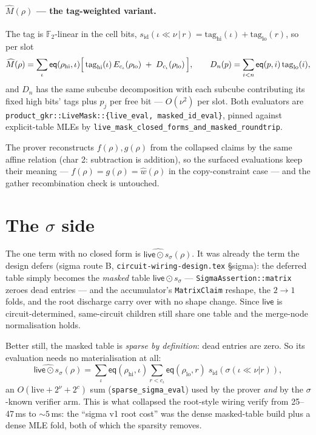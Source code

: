 \documentclass[11pt]{article}
\newcommand{\F}{\mathbb{F}}
\newcommand{\Ftwo}{\F_2}
\newcommand{\eq}{\mathsf{eq}}
\newcommand{\code}[1]{\texttt{#1}}
\newcommand{\sid}{s_{\mathrm{id}}}
\newcommand{\ssig}{s_{\sigma}}
\newcommand{\live}{\mathsf{live}}
\newcommand{\Mh}{\widehat{M}}
\theoremstyle{definition}
\begin{document}
\paragraph{$\Mh(\rho)$ --- the tag-weighted variant.} The tag is
$\Ftwo$-linear in the cell bits,
$\sid(\iota \ll \nu \,|\, r) = \mathrm{tag}_{\mathrm{hi}}(\iota) +
\mathrm{tag}_{\mathrm{lo}}(r)$, so per slot
\[
\Mh(\rho) = \sum_\iota \eq(\rho_{\mathrm{hi}}, \iota)
\Bigl[\, \mathrm{tag}_{\mathrm{hi}}(\iota)\, E_{c_\iota}(\rho_{\mathrm{lo}})
\;+\; D_{c_\iota}(\rho_{\mathrm{lo}}) \,\Bigr],
\qquad
D_n(p) = \sum_{i<n} \eq(p, i)\,\mathrm{tag}_{\mathrm{lo}}(i),
\]
and $D_n$ has the same subcube decomposition with each subcube
contributing its fixed high bits' tags plus $p_j$ per free bit ---
$O(\nu^2)$ per slot. Both evaluators are
\code{product\_gkr::LiveMask::\{live\_eval, masked\_id\_eval\}}, pinned
against explicit-table MLEs by
\code{live\_mask\_closed\_forms\_and\_masked\_roundtrip}.

The prover reconstructs $f(\rho), g(\rho)$ from the collapsed claims by
the same affine relation (char 2: subtraction is addition), so the
surfaced evaluations keep their meaning --- $f(\rho) = g(\rho) =
\widehat{w}(\rho)$ in the copy-constraint case --- and the gather
recombination check is untouched.

\section{The \texorpdfstring{$\sigma$}{sigma} side}

The one term with no closed form is
$\widehat{\live \odot \ssig}(\rho)$. It was already the term the design
defers (sigma route B, \code{circuit-wiring-design.tex} \S sigma): the
deferred table simply becomes the \emph{masked} table
$\live \odot \ssig$ --- \code{SigmaAssertion::matrix} zeroes dead
entries --- and the accumulator's \code{MatrixClaim} reshape, the
$2{\to}1$ folds, and the root discharge carry over with no shape change.
Since $\live$ is circuit-determined, same-circuit children still share
one table and the merge-node normalisation holds.

Better still, the masked table is \emph{sparse by definition}: dead
entries are zero. So its evaluation needs no materialisation at all:
\[
\widehat{\live \odot \ssig}(\rho)
= \sum_\iota \eq(\rho_{\mathrm{hi}}, \iota)
  \sum_{r < c_\iota} \eq(\rho_{\mathrm{lo}}, r)\; \sid(\sigma(\iota \ll \nu | r)),
\]
an $O(\mathrm{live} + 2^{\nu} + 2^{c})$ sum
(\code{sparse\_sigma\_eval}) used by the prover \emph{and} by the
$\sigma$-known verifier arm. This is what collapsed the root-style
wiring verify from 25--47\,ms to ${\sim}5$\,ms: the ``sigma v1 root
cost'' was the dense masked-table build plus a dense MLE fold, both of
which the sparsity removes.
\end{document}
